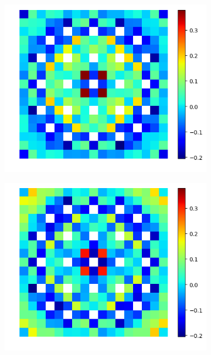 \begin{figure}[H]
  \centering 
\begin{subfigure}{0.45\textwidth}
  \centering
  \includegraphics[width=\linewidth]{figures/assembly/fiss-null-errors}
  \caption{}
  \label{fig:assm-fiss-null-error}
\end{subfigure}
\begin{subfigure}{0.45\textwidth}
  \centering
  \includegraphics[width=\linewidth]{figures/assembly/fiss-degenerate-errors}
  \caption{}
  \label{fig:assm-fiss-degen-error}
\end{subfigure}

\end{figure}
